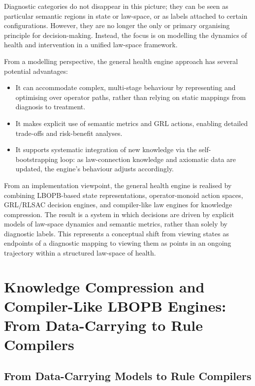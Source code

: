\documentclass[11pt]{book}
\theoremstyle{plain}
\theoremstyle{definition}
\theoremstyle{remark}
\begin{document}
Diagnostic categories do not disappear in this picture; they can be
seen as particular semantic regions in state or law-space, or as labels
attached to certain configurations. However, they are no longer the
only or primary organising principle for decision-making. Instead, the
focus is on modelling the dynamics of health and intervention in a
unified law-space framework.

From a modelling perspective, the general health engine approach has
several potential advantages:

\begin{itemize}
  \item It can accommodate complex, multi-stage behaviour by
        representing and optimising over operator paths, rather than
        relying on static mappings from diagnosis to treatment.
  \item It makes explicit use of semantic metrics and GRL actions,
        enabling detailed trade-offs and risk-benefit analyses.
  \item It supports systematic integration of new knowledge via the
        self-bootstrapping loop: as law-connection knowledge and
        axiomatic data are updated, the engine's behaviour adjusts
        accordingly.
\end{itemize}

From an implementation viewpoint, the general health engine is realised
by combining LBOPB-based state representations, operator-monoid action
spaces, GRL/RLSAC decision engines, and compiler-like law engines for
knowledge compression. The result is a system in which decisions are
driven by explicit models of law-space dynamics and semantic metrics,
rather than solely by diagnostic labels. This represents a conceptual
shift from viewing states as endpoints of a diagnostic mapping to
viewing them as points in an ongoing trajectory within a structured
law-space of health.

\chapter[Knowledge Compression and Compiler-Like LBOPB Engines]{Knowledge Compression and Compiler-Like LBOPB Engines:\\
         From Data-Carrying to Rule Compilers}


\section{From Data-Carrying Models to Rule Compilers}
\end{document}
